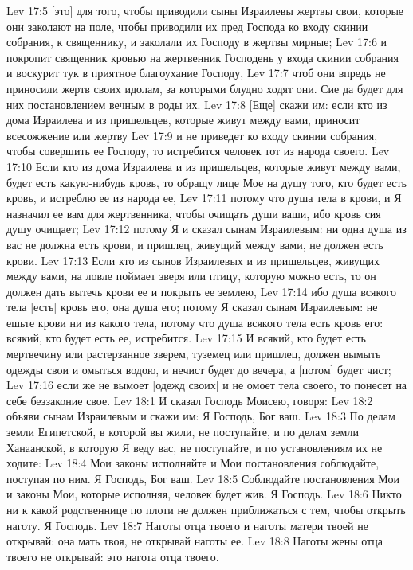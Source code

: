 Lev 17:5  [это] для того, чтобы приводили сыны Израилевы жертвы свои, которые они заколают на поле, чтобы приводили их пред Господа ко входу скинии собрания, к священнику, и заколали их Господу в жертвы мирные;
Lev 17:6  и покропит священник кровью на жертвенник Господень у входа скинии собрания и воскурит тук в приятное благоухание Господу,
Lev 17:7  чтоб они впредь не приносили жертв своих идолам, за которыми блудно ходят они. Сие да будет для них постановлением вечным в роды их.
Lev 17:8  [Еще] скажи им: если кто из дома Израилева и из пришельцев, которые живут между вами, приносит всесожжение или жертву
Lev 17:9  и не приведет ко входу скинии собрания, чтобы совершить ее Господу, то истребится человек тот из народа своего.
Lev 17:10  Если кто из дома Израилева и из пришельцев, которые живут между вами, будет есть какую-нибудь кровь, то обращу лице Мое на душу того, кто будет есть кровь, и истреблю ее из народа ее,
Lev 17:11  потому что душа тела в крови, и Я назначил ее вам для жертвенника, чтобы очищать души ваши, ибо кровь сия душу очищает;
Lev 17:12  потому Я и сказал сынам Израилевым: ни одна душа из вас не должна есть крови, и пришлец, живущий между вами, не должен есть крови.
Lev 17:13  Если кто из сынов Израилевых и из пришельцев, живущих между вами, на ловле поймает зверя или птицу, которую можно есть, то он должен дать вытечь крови ее и покрыть ее землею,
Lev 17:14  ибо душа всякого тела [есть] кровь его, она душа его; потому Я сказал сынам Израилевым: не ешьте крови ни из какого тела, потому что душа всякого тела есть кровь его: всякий, кто будет есть ее, истребится.
Lev 17:15  И всякий, кто будет есть мертвечину или растерзанное зверем, туземец или пришлец, должен вымыть одежды свои и омыться водою, и нечист будет до вечера, а [потом] будет чист;
Lev 17:16  если же не вымоет [одежд своих] и не омоет тела своего, то понесет на себе беззаконие свое.
Lev 18:1  И сказал Господь Моисею, говоря:
Lev 18:2  объяви сынам Израилевым и скажи им: Я Господь, Бог ваш.
Lev 18:3  По делам земли Египетской, в которой вы жили, не поступайте, и по делам земли Ханаанской, в которую Я веду вас, не поступайте, и по установлениям их не ходите:
Lev 18:4  Мои законы исполняйте и Мои постановления соблюдайте, поступая по ним. Я Господь, Бог ваш.
Lev 18:5  Соблюдайте постановления Мои и законы Мои, которые исполняя, человек будет жив. Я Господь.
Lev 18:6  Никто ни к какой родственнице по плоти не должен приближаться с тем, чтобы открыть наготу. Я Господь.
Lev 18:7  Наготы отца твоего и наготы матери твоей не открывай: она мать твоя, не открывай наготы ее.
Lev 18:8  Наготы жены отца твоего не открывай: это нагота отца твоего.
